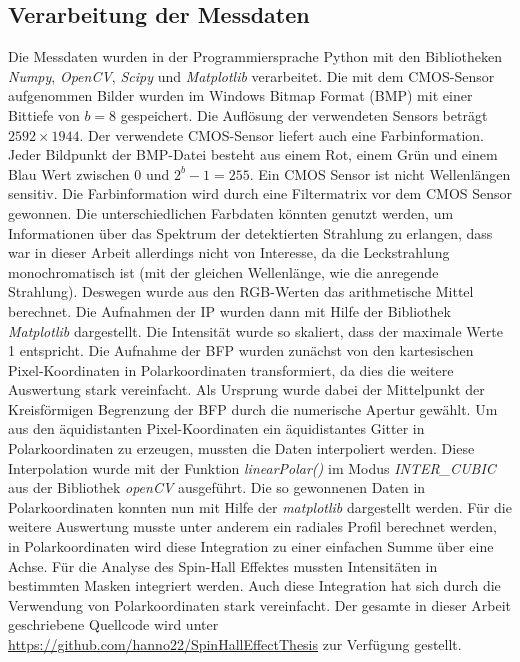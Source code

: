 \documentclass[titlepage,  ngerman]{article}
\begin{document}
	\subsection{Verarbeitung der Messdaten}
	\label{sec:polar_calculation}
	Die Messdaten wurden in der Programmiersprache Python mit den Bibliotheken \textit{Numpy}, \textit{OpenCV}, \textit{Scipy} und \textit{Matplotlib} verarbeitet. Die mit dem CMOS-Sensor aufgenommen Bilder wurden im Windows Bitmap Format (BMP) mit einer Bittiefe von  $b = 8$ gespeichert. Die Auflösung der verwendeten Sensors beträgt $2592 \times 1944$. Der verwendete CMOS-Sensor liefert auch eine Farbinformation. Jeder Bildpunkt der BMP-Datei besteht aus einem Rot, einem Grün und einem Blau Wert zwischen $0$ und $2^b - 1= 255$. Ein CMOS Sensor ist nicht Wellenlängen sensitiv. Die Farbinformation wird durch eine Filtermatrix vor dem CMOS Sensor gewonnen. Die unterschiedlichen Farbdaten könnten genutzt werden, um Informationen über das Spektrum der detektierten Strahlung zu erlangen, dass war in dieser Arbeit allerdings nicht von Interesse, da die Leckstrahlung monochromatisch ist (mit der gleichen Wellenlänge, wie die anregende Strahlung). Deswegen wurde aus den RGB-Werten das arithmetische Mittel berechnet. Die Aufnahmen der IP wurden dann mit Hilfe der Bibliothek \textit{Matplotlib} dargestellt. Die Intensität wurde so skaliert, dass der maximale Werte 1 entspricht. Die Aufnahme der BFP wurden zunächst von den kartesischen Pixel-Koordinaten in Polarkoordinaten transformiert, da dies die weitere Auswertung stark vereinfacht. Als Ursprung wurde dabei der Mittelpunkt der Kreisförmigen Begrenzung der BFP durch die numerische Apertur gewählt. Um aus den äquidistanten Pixel-Koordinaten ein äquidistantes Gitter in Polarkoordinaten zu erzeugen, mussten die Daten interpoliert werden. Diese Interpolation wurde mit der Funktion \textit{linearPolar()} im Modus \textit{INTER\_CUBIC} aus der Bibliothek \textit{openCV} ausgeführt. Die so gewonnenen Daten in Polarkoordinaten konnten nun mit Hilfe der \textit{matplotlib} dargestellt werden. Für die weitere Auswertung musste unter anderem ein radiales Profil berechnet werden, in Polarkoordinaten wird diese Integration zu einer einfachen Summe über eine Achse. Für die Analyse des Spin-Hall Effektes mussten Intensitäten in bestimmten Masken integriert werden. Auch diese Integration hat sich durch die Verwendung von Polarkoordinaten stark vereinfacht. Der gesamte in dieser Arbeit geschriebene Quellcode wird unter \url{https://github.com/hanno22/SpinHallEffectThesis} zur Verfügung gestellt.
	\newpage
	
\end{document}
